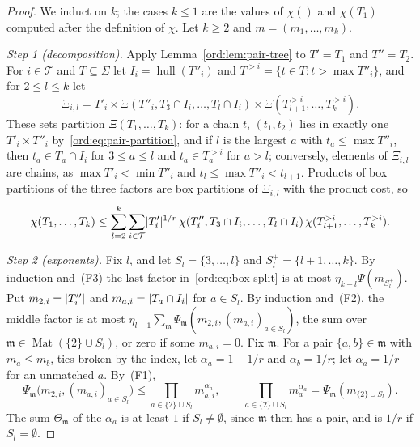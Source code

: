 \begin{proof}
We induct on $k$; the cases $k\le1$ are the values of $\chi()$ and $\chi(T_1)$ computed after the definition of $\chi$.
Let $k\ge2$ and $m=(m_1,\dots,m_k)$.

\emph{Step 1 (decomposition).} Apply Lemma~\ref{ord:lem:pair-tree} to $T'=T_1$ and $T''=T_2$. For $i\in\mathcal T$ and
$T\subseteq\Sigma$ let $I_i=\operatorname{hull}(T''_i)$ and $T^{>i}=\{t\in T:t>\max T''_i\}$, and for $2\le l\le k$ let
\[
 \Xi_{i,l}=T'_i\times\Xi(T''_i,T_3\cap I_i,\dots,T_l\cap I_i)\times\Xi(T_{l+1}^{>i},\dots,T_k^{>i}).
\]
These sets partition $\Xi(T_1,\dots,T_k)$: for a chain $t$, $(t_1,t_2)$ lies in exactly one $T'_i\times T''_i$
by~\eqref{ord:eq:pair-partition}, and if $l$ is the largest $a$ with $t_a\le\max T''_i$, then $t_a\in T_a\cap I_i$ for
$3\le a\le l$ and $t_a\in T_a^{>i}$ for $a>l$; conversely, elements of $\Xi_{i,l}$ are chains, as
$\max T'_i<\min T''_i$ and $t_l\le\max T''_i<t_{l+1}$. Products of box partitions of the three factors are box
partitions of $\Xi_{i,l}$ with the product cost, so
\begin{equation}\label{ord:eq:box-split}
 \chi(T_1,\dots,T_k)\le\sum_{l=2}^k\sum_{i\in\mathcal T}\lvert T'_i\rvert^{1/r}\,
 \chi(T''_i,T_3\cap I_i,\dots,T_l\cap I_i)\,\chi(T_{l+1}^{>i},\dots,T_k^{>i}).
\end{equation}

\emph{Step 2 (exponents).} Fix $l$, and let $S_l=\{3,\dots,l\}$ and $S_l^+=\{l+1,\dots,k\}$. By induction and~(F3) the
last factor in~\eqref{ord:eq:box-split} is at most $\eta_{k-l}\Psi(m_{S_l^+})$. Put $m_{2,i}=\lvert T''_i\rvert$ and
$m_{a,i}=\lvert T_a\cap I_i\rvert$ for $a\in S_l$. By induction and~(F2), the middle factor is at most
$\eta_{l-1}\sum_{\mathfrak m}\Psi_{\mathfrak m}(m_{2,i},(m_{a,i})_{a\in S_l})$, the sum over
$\mathfrak m\in\operatorname{Mat}(\{2\}\cup S_l)$, or zero if some $m_{a,i}=0$. Fix $\mathfrak m$. For a pair
$\{a,b\}\in\mathfrak m$ with $m_a\le m_b$, ties broken by the index, let $\alpha_a=1-1/r$ and $\alpha_b=1/r$; let
$\alpha_a=1/r$ for an unmatched $a$. By~(F1),
\begin{equation}\label{ord:eq:box-exponents}
 \Psi_{\mathfrak m}\bigl(m_{2,i},(m_{a,i})_{a\in S_l}\bigr)\le\prod_{a\in\{2\}\cup S_l}m_{a,i}^{\alpha_a},\qquad
 \prod_{a\in\{2\}\cup S_l}m_a^{\alpha_a}=\Psi_{\mathfrak m}(m_{\{2\}\cup S_l}).
\end{equation}
The sum $\Theta_{\mathfrak m}$ of the $\alpha_a$ is at least $1$ if $S_l\ne\emptyset$, since $\mathfrak m$ then has a
pair, and is $1/r$ if $S_l=\emptyset$.


\end{proof}
